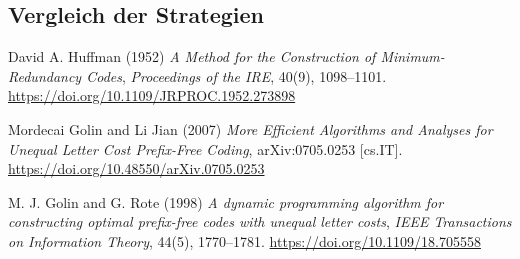 \documentclass[a4paper,10pt,ngerman]{scrartcl}
\begin{document}
\subsection{Vergleich der Strategien}
\begin{thebibliography}{9}
David A. Huffman (1952) \emph{A Method for the Construction of Minimum-Redundancy Codes}, 
\emph{Proceedings of the IRE}, 40(9), 1098--1101. 
\url{https://doi.org/10.1109/JRPROC.1952.273898}

Mordecai Golin and Li Jian (2007) \emph{More Efficient Algorithms and Analyses for Unequal Letter Cost Prefix-Free Coding}, 
arXiv:0705.0253 [cs.IT]. \url{https://doi.org/10.48550/arXiv.0705.0253}

M. J. Golin and G. Rote (1998) \emph{A dynamic programming algorithm for constructing optimal prefix-free codes with unequal letter costs}, 
\emph{IEEE Transactions on Information Theory}, 44(5), 1770--1781. 
\url{https://doi.org/10.1109/18.705558}


\end{thebibliography}
\end{document}
